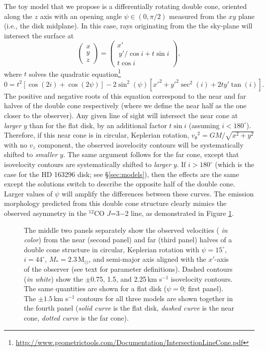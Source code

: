 The toy model that we propose is a differentially rotating double cone, oriented
along the $z$ axis with an opening angle $\psi \in (0,\pi/2)$ measured from the 
$xy$ plane (i.e., the disk midplane). In this case, rays originating from the 
the sky-plane will intersect the surface at
\begin{equation}
\left(\begin{array}{c} x \\ y \\ z \end{array} \right) = \left(\begin{array}{c} x' \\\ y' / \cos i + t \sin i \\ t\cos i\end{array}\right),
\end{equation}
where $t$ solves the quadratic equation\footnote{\url{http://www.geometrictools.com/Documentation/IntersectionLineCone.pdf}}
\begin{equation}
0 = t^2 \left[\cos(2i) + \cos(2\psi)\right] - 2 \sin^2(\psi)\left[{x'}^2 + {y'}^2 \sec^2(i) + 2 t y' \tan(i)\right].
\end{equation}
The positive and negative roots of this equation correspond to the near and 
far halves of the double cone respectively (where we define the near half as 
the one closer to the observer). Any given line of sight will intersect the near
cone at {\it larger} $y$ than for the flat disk, by an additional factor 
$t\sin i$ (assuming $i < 180^\circ$).  Therefore, if this near cone is in 
circular, Keplerian rotation, ${v_\theta}^2 =GM/\sqrt{x^2 + y^2}$ with no $v_z$ 
component, the observed isovelocity contours will be systematically shifted to 
{\it smaller} $y$.   The same argument follows for the far cone, except that 
isovelocity contours are systematically shifted to {\it larger} $y$.  If 
$i>180^\circ$ (which is the case for the HD 163296 disk; see 
\S\ref{sec:models}), then the effects are the same except the solutions switch 
to describe the opposite half of the double cone.  Larger values of $\psi$ will 
amplify the differences between these curves.  The emission morphology predicted
from this double cone structure clearly mimics the observed asymmetry in the 
$^{12}$CO $J$=3$-$2 line, as demonstrated in Figure \ref{fig:cone}.

\begin{figure}[t!]
\caption{The middle two panels separately show the observed velocities ({\it 
in color}) from the near (second panel) and far (third panel) halves of a double
cone structure in circular, Keplerian rotation with 
$\psi = 15^\circ$, $i=44^\circ$, 
$M_\ast = 2.3$\,M$_\odot$, and semi-major axis aligned with the $x'$-axis of the
observer (see text for parameter definitions).  Dashed contours ({\it in white})
show the $\pm$0.75, 1.5, and 2.25\,km s$^{-1}$ isovelocity contours.  The same 
quantities are shown for a flat disk ($\psi=0$; first panel).  The 
$\pm 1.5$\,km s$^{-1}$ contours for all three models are shown together in the 
fourth panel ({\it solid curve} is the flat disk, {\it dashed curve} is the near
cone, {\it dotted curve} is the far cone).
\label{fig:cone}}
\end{figure}

